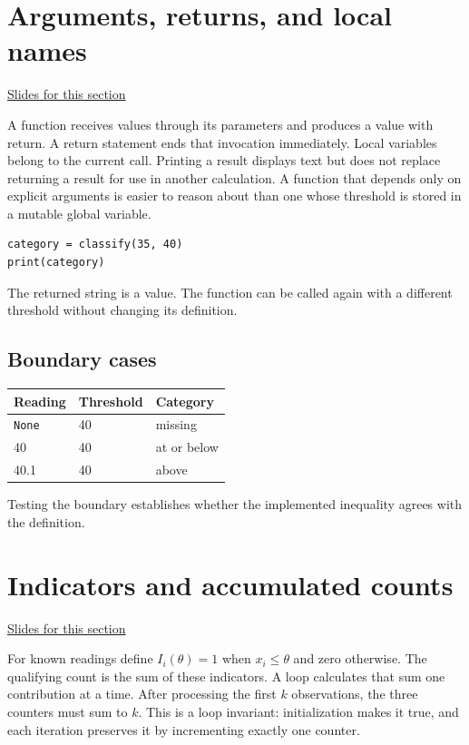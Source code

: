 \documentclass[11pt,letterpaper]{article}
\theoremstyle{definition}\newtheorem{definition}{Definition}\newtheorem{example}{Example}
\numberwithin{equation}{section}
\begin{document}
\section{Arguments, returns, and local names}
\hypertarget{note-arguments-returns-and-local-names}{}\label{note:arguments-returns-and-local-names}
{\small \href{slides.html\#frame=arguments-returns-and-local-names\&step=1}{Slides for this section}}\par
A function receives values through its parameters and produces a value with return. A return statement ends that invocation immediately. Local variables belong to the current call. Printing a result displays text but does not replace returning a result for use in another calculation. A function that depends only on explicit arguments is easier to reason about than one whose threshold is stored in a mutable global variable.

\begin{minipage}{\linewidth}
\begin{verbatim}
category = classify(35, 40)
print(category)
\end{verbatim}
\end{minipage}

The returned string is a value. The function can be called again with a different threshold without changing its definition.

\subsection*{Boundary cases}
\begin{center}\begin{tabular}{lll}\toprule
Reading & Threshold & Category\\\midrule
\texttt{None}&40&missing\\40&40&at or below\\40.1&40&above\\\bottomrule\end{tabular}\end{center}

Testing the boundary establishes whether the implemented inequality agrees with the definition.
\section{Indicators and accumulated counts}
\hypertarget{note-indicators-and-accumulated-counts}{}\label{note:indicators-and-accumulated-counts}
{\small \href{slides.html\#frame=indicators-and-accumulated-counts\&step=1}{Slides for this section}}\par
For known readings define $I_i(\theta)=1$ when $x_i\leq\theta$ and zero otherwise. The qualifying count is the sum of these indicators. A loop calculates that sum one contribution at a time. After processing the first $k$ observations, the three counters must sum to $k$. This is a loop invariant: initialization makes it true, and each iteration preserves it by incrementing exactly one counter.
\end{document}

